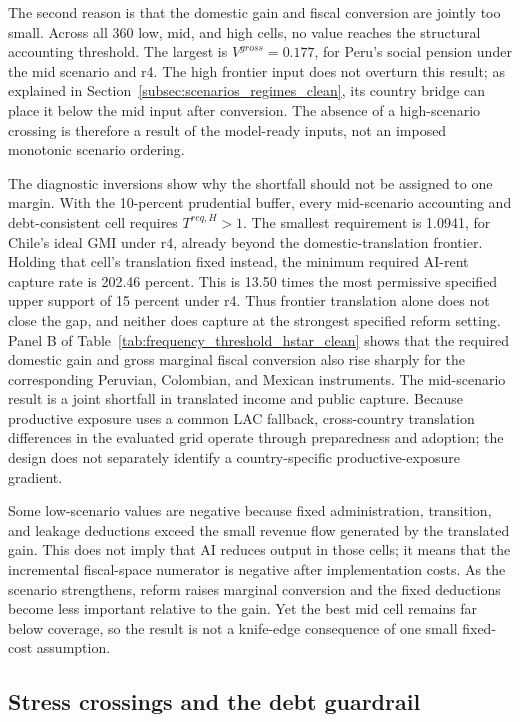 The second reason is that the domestic gain and fiscal conversion are jointly too small. Across all 360 low, mid, and high cells, no value reaches the structural accounting threshold. The largest is $V^{gross}=0.177$, for Peru's social pension under the mid scenario and r4. The high frontier input does not overturn this result; as explained in Section~\ref{subsec:scenarios_regimes_clean}, its country bridge can place it below the mid input after conversion. The absence of a high-scenario crossing is therefore a result of the model-ready inputs, not an imposed monotonic scenario ordering.

The diagnostic inversions show why the shortfall should not be assigned to one margin. With the 10-percent prudential buffer, every mid-scenario accounting and debt-consistent cell requires $T^{req,H}>1$. The smallest requirement is 1.0941, for Chile's ideal GMI under r4, already beyond the domestic-translation frontier. Holding that cell's translation fixed instead, the minimum required AI-rent capture rate is 202.46 percent. This is 13.50 times the most permissive specified upper support of 15 percent under r4. Thus frontier translation alone does not close the gap, and neither does capture at the strongest specified reform setting. Panel B of Table~\ref{tab:frequency_threshold_hstar_clean} shows that the required domestic gain and gross marginal fiscal conversion also rise sharply for the corresponding Peruvian, Colombian, and Mexican instruments. The mid-scenario result is a joint shortfall in translated income and public capture. Because productive exposure uses a common LAC fallback, cross-country translation differences in the evaluated grid operate through preparedness and adoption; the design does not separately identify a country-specific productive-exposure gradient.

Some low-scenario values are negative because fixed administration, transition, and leakage deductions exceed the small revenue flow generated by the translated gain. This does not imply that AI reduces output in those cells; it means that the incremental fiscal-space numerator is negative after implementation costs. As the scenario strengthens, reform raises marginal conversion and the fixed deductions become less important relative to the gain. Yet the best mid cell remains far below coverage, so the result is not a knife-edge consequence of one small fixed-cost assumption.

\subsection{Stress crossings and the debt guardrail}\label{subsec:results_stress_debt}


